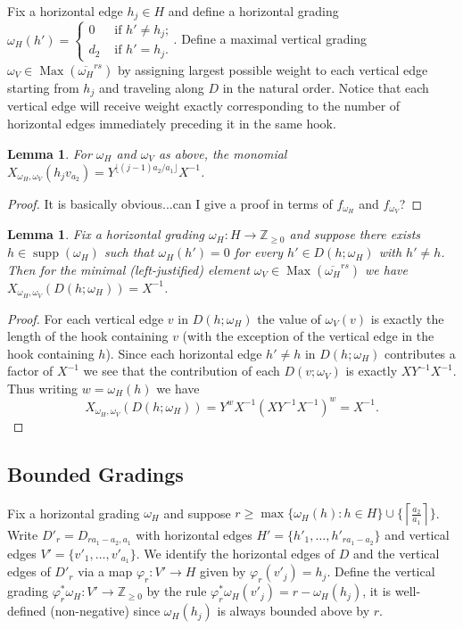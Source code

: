 \documentclass{amsart}
\newtheorem{lemma}[theorem]{Lemma}
\newcommand{\ZZ}{\mathbb{Z}}
\newcommand{\supp}{\operatorname{supp}}
\newcommand{\Max}{\operatorname{Max}}
\begin{document}
 Fix a horizontal edge $h_j\in H$ and define a horizontal grading $\omega_H(h')=\begin{cases} 0 & \text{ if $h'\ne h_j$;}\\ d_2 & \text{ if $h'=h_j$.}\end{cases}$.  Define a maximal vertical grading $\omega_V\in\Max(\overline{\omega_H}^{rs})$ by assigning largest possible weight to each vertical edge starting from $h_j$ and traveling along $D$ in the natural order.  Notice that each vertical edge will receive weight exactly corresponding to the number of horizontal edges immediately preceding it in the same hook.
 \begin{lemma}
  For $\omega_H$ and $\omega_V$ as above, the monomial $X_{\omega_H,\omega_V}(h_jv_{a_2})=Y^{\lfloor(j-1)a_2/a_1\rfloor}X^{-1}$.
 \end{lemma}
 \begin{proof}
  It is basically obvious...can I give a proof in terms of $f_{\omega_H}$ and $f_{\omega_V}$?
 \end{proof}

 \begin{lemma}
  Fix a horizontal grading $\omega_H:H\to\ZZ_{\ge0}$ and suppose there exists $h\in\supp(\omega_H)$ such that $\omega_H(h')=0$ for every $h'\in D(h;\omega_H)$ with $h'\ne h$.  Then for the minimal (left-justified) element $\omega_V\in\Max(\overline{\omega_H}^{rs})$ we have $X_{\omega_H,\omega_V}(D(h;\omega_H))=X^{-1}$.
 \end{lemma}
 \begin{proof}
  For each vertical edge $v$ in $D(h;\omega_H)$ the value of $\omega_V(v)$ is exactly the length of the hook containing $v$ (with the exception of the vertical edge in the hook containing $h$).  Since each horizontal edge $h'\ne h$ in $D(h;\omega_H)$ contributes a factor of $X^{-1}$ we see that the contribution of each $D(v;\omega_V)$ is exactly $XY^{-1}X^{-1}$.  Thus writing $w=\omega_H(h)$ we have
  \[X_{\omega_H,\omega_V}(D(h;\omega_H))=Y^wX^{-1}(XY^{-1}X^{-1})^w=X^{-1}.\]
 \end{proof}

 \subsection{Bounded Gradings}  Fix a horizontal grading $\omega_H$ and suppose $r\ge\max\{\omega_H(h):h\in H\}\cup\{\left\lceil\frac{a_2}{a_1}\right\rceil\}$.  Write $D'_r=D_{ra_1-a_2,a_1}$ with horizontal edges $H'=\{h'_1,\ldots,h'_{ra_1-a_2}\}$ and vertical edges $V'=\{v'_1,\ldots,v'_{a_1}\}$.  We identify the horizontal edges of $D$ and the vertical edges of $D'_r$ via a map $\varphi_r:V'\to H$ given by $\varphi_r(v'_j)=h_j$.  Define the vertical grading $\varphi^*_r\omega_H:V'\to\ZZ_{\ge0}$ by the rule $\varphi^*_r\omega_H(v'_j)=r-\omega_H(h_j)$, it is well-defined (non-negative) since $\omega_H(h_j)$ is always bounded above by $r$.
\end{document}

